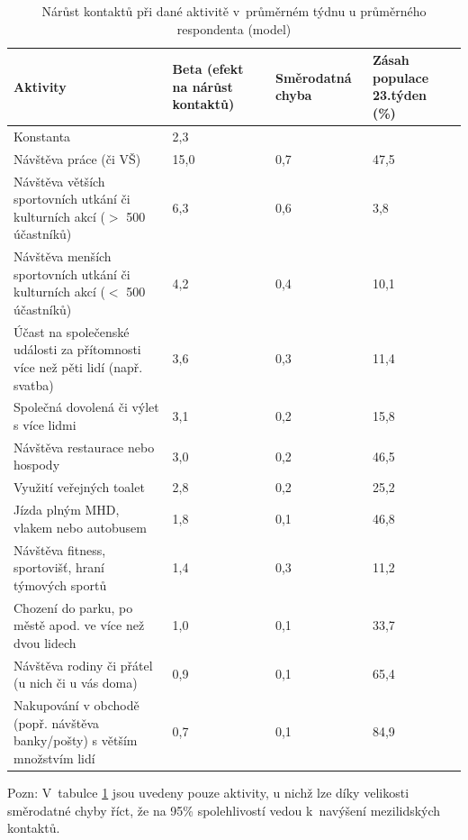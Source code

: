 \begin{table}[ht]
    \centering
    \caption{Nárůst kontaktů při dané aktivitě v průměrném týdnu u průměrného respondenta (model)}
    
\begin{tabular}{ p{5cm} p{2cm} p{2cm} p{2cm}  }
 \hline
 Aktivity & Beta \newline (efekt na \newline nárůst kontaktů) & Směrodatná \newline chyba & Zásah populace \newline 23.týden (\%)\\
 \hline
 Konstanta   & 2,3    & & \\
 Návštěva práce (či VŠ) & 15,0 & 0,7 &47,5\\
 Návštěva větších sportovních utkání či kulturních akcí ($>$ 500 účastníků) &
6,3 &
0,6 &
3,8\\
  Návštěva menších sportovních utkání či kulturních akcí ($<$ 500 účastníků)&
4,2&
0,4&
10,1\\
  Účast na společenské události za přítomnosti více než pěti lidí (např. svatba)&
3,6&
0,3&
11,4\\
  Společná dovolená či výlet s více lidmi&
3,1&
0,2&
15,8\\
  Návštěva restaurace nebo hospody&
3,0&
0,2&
46,5\\
  Využití veřejných toalet&
2,8&
0,2&
25,2\\
  Jízda plným MHD, vlakem nebo autobusem&
1,8&
0,1&
46,8\\
  Návštěva fitness, sportovišť, hraní týmových sportů&
1,4&
0,3&
11,2\\
  Chození do parku, po městě apod. ve více než dvou lidech&
1,0&
0,1&
33,7\\
  Návštěva rodiny či přátel (u nich či u vás doma)&
0,9&
0,1&
65,4\\
  Nakupování v obchodě (popř. návštěva banky/pošty) s větším množstvím lidí&
0,7&
0,1&
84,9\\
 \hline
\end{tabular}
    
    \label{tab:narust-kontaktu}
\end{table}

Pozn: V tabulce \ref{tab:narust-kontaktu} jsou uvedeny pouze aktivity, u nichž lze díky velikosti směrodatné chyby říct, že na 95\% spolehlivostí vedou k navýšení mezilidských kontaktů.

